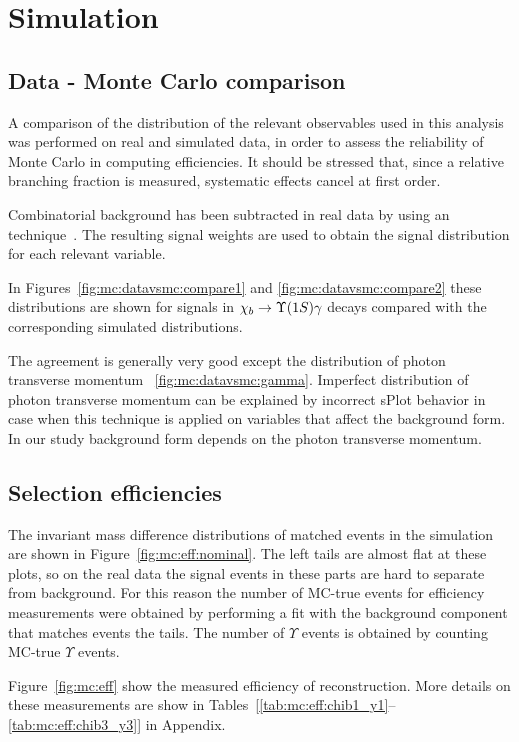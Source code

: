 \section{Simulation}
\label{sec:mc}

\subsection{Data - Monte Carlo comparison}
\label{sec:mc:datavsmc}

A comparison of the distribution of the relevant observables used in this
analysis was performed on real and simulated data, in order to assess the
reliability of Monte Carlo in computing efficiencies. It should be stressed
that, since a relative branching fraction is measured, systematic effects cancel
at first order.

Combinatorial background has been subtracted in real data by using an
\sPlot  technique~\cite{Pivk:2004ty}.
The resulting signal weights are used to obtain the signal distribution for each
relevant variable. 


In Figures~\ref{fig:mc:datavsmc:compare1} and \ref{fig:mc:datavsmc:compare2}
these distributions  are shown for signals in $\chib \to \Y1S \gamma$ decays
compared with the corresponding simulated distributions.

The agreement is generally very good except the distribution of photon
transverse momentum ~\ref{fig:mc:datavsmc:gamma}. Imperfect  distribution of
photon transverse momentum can be explained by incorrect sPlot behavior in case
when this technique is applied on variables that affect the background form. In
our study background form depends on the photon transverse momentum.



\subsection{Selection efficiencies}
\label{sec:mc:eff}

The invariant mass difference distributions of matched events in the \chib
simulation are shown in Figure~\ref{fig:mc:eff:nominal}. The left tails are
almost flat at these plots, so on the real data the signal events in these parts
are hard to separate from background. For this reason the number of MC-true
\chib events for efficiency measurements were obtained by performing a fit with
the background component that matches events the tails. The number of $\Upsilon$
events is obtained by counting MC-true $\Upsilon$ events.



Figure~\ref{fig:mc:eff} show the measured efficiency of \chib reconstruction.
More details on these measurements are show in
Tables~[\ref{tab:mc:eff:chib1_y1}--\ref{tab:mc:eff:chib3_y3}] in Appendix.


